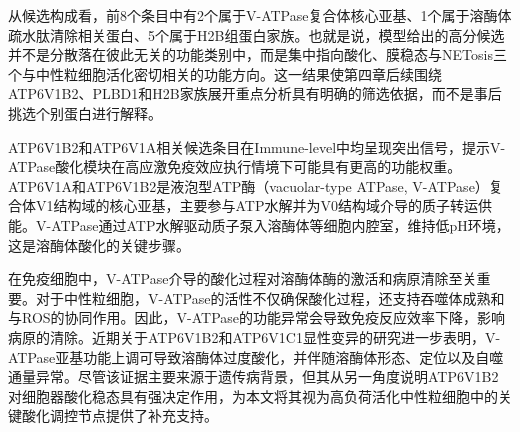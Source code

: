 \begin{table}[htbp]
\centering
\caption{免疫情境中具有代表性的前8个高分候选条目}
\label{tab:top_proteins}
\end{table}

从候选构成看，前8个条目中有2个属于V-ATPase复合体核心亚基、1个属于溶酶体疏水肽清除相关蛋白、5个属于H2B组蛋白家族。也就是说，模型给出的高分候选并不是分散落在彼此无关的功能类别中，而是集中指向酸化、膜稳态与NETosis三个与中性粒细胞活化密切相关的功能方向。这一结果使第四章后续围绕ATP6V1B2、PLBD1和H2B家族展开重点分析具有明确的筛选依据，而不是事后挑选个别蛋白进行解释。

ATP6V1B2和ATP6V1A相关候选条目在Immune-level中均呈现突出信号，提示V-ATPase酸化模块在高应激免疫效应执行情境下可能具有更高的功能权重。ATP6V1A和ATP6V1B2是液泡型ATP酶（vacuolar-type ATPase, V-ATPase）复合体V1结构域的核心亚基，主要参与ATP水解并为V0结构域介导的质子转运供能。V-ATPase通过ATP水解驱动质子泵入溶酶体等细胞内腔室，维持低pH环境，这是溶酶体酸化的关键步骤\cite{chen2025emerging}。

在免疫细胞中，V-ATPase介导的酸化过程对溶酶体酶的激活和病原清除至关重要。对于中性粒细胞，V-ATPase的活性不仅确保酸化过程，还支持吞噬体成熟和与ROS的协同作用。因此，V-ATPase的功能异常会导致免疫反应效率下降，影响病原的清除\cite{kim2025failure}。近期关于ATP6V1B2和ATP6V1C1显性变异的研究进一步表明，V-ATPase亚基功能上调可导致溶酶体过度酸化，并伴随溶酶体形态、定位以及自噬通量异常\cite{carpentieri2024dominantly}。尽管该证据主要来源于遗传病背景，但其从另一角度说明ATP6V1B2对细胞器酸化稳态具有强决定作用，为本文将其视为高负荷活化中性粒细胞中的关键酸化调控节点提供了补充支持。

